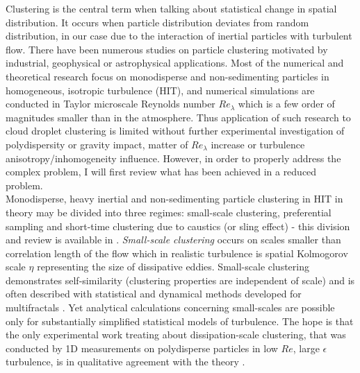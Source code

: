 \documentclass[../main.tex]{subfiles}
\begin{document}
Clustering is the central term when talking about statistical change in spatial distribution. It occurs when particle distribution deviates from random distribution, in our case due to the interaction of inertial particles with turbulent flow. There have been numerous studies on particle clustering motivated by industrial, geophysical or astrophysical applications. Most of the numerical and theoretical research focus on monodisperse and non-sedimenting particles in homogeneous, isotropic turbulence (HIT), and numerical simulations are conducted in Taylor microscale Reynolds number $Re_{\lambda}$ which is a few order of magnitudes smaller than in the atmosphere. Thus  application of such research to cloud droplet clustering is limited without further experimental investigation of polydispersity or gravity impact, matter of $Re_{\lambda}$ increase or turbulence anisotropy/inhomogeneity influence. However, in order to properly address the complex problem, I will first review what has been achieved in a reduced problem.\\
Monodisperse, heavy inertial and non-sedimenting particle clustering in HIT in theory may be divided into three regimes: small-scale clustering, preferential sampling and short-time clustering due to caustics (or sling effect) - this division and review is available in \citet{Gustavsson2016}. \emph{Small-scale clustering} occurs on scales smaller than correlation length of the flow which in realistic turbulence is spatial Kolmogorov scale $\eta$ representing the size of dissipative eddies. Small-scale clustering demonstrates self-similarity (clustering properties are independent of scale) and is often described with statistical and dynamical methods developed for multifractals \citep{Falkovich2003, Bec2005, Bec2006b, Bec2007, Bragg2014}. Yet analytical calculations concerning small-scales are possible only for substantially simplified statistical models of turbulence. The hope is that the only experimental work treating about dissipation-scale clustering, that was conducted by 1D measurements on polydisperse particles in low $Re$, large $\epsilon$ turbulence, is in qualitative agreement with the theory \citep{Saw2008}.\\
\end{document}
